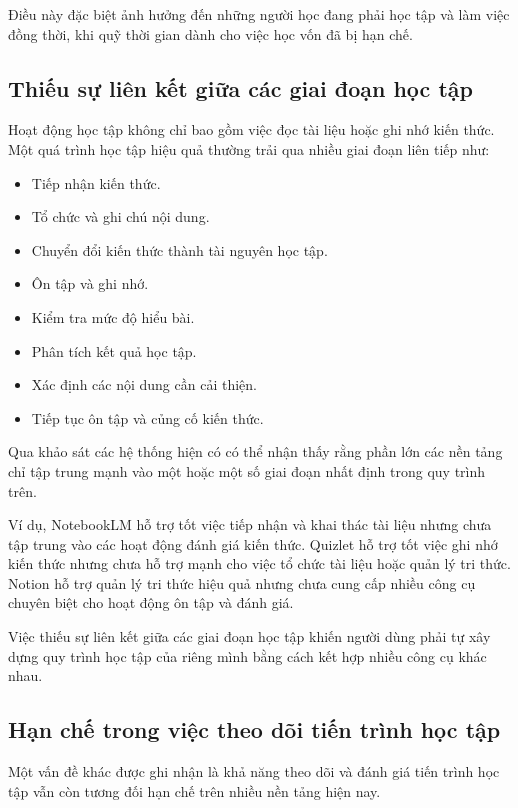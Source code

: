 Điều này đặc biệt ảnh hưởng đến những người học đang phải học tập và làm việc đồng thời, khi quỹ thời gian dành cho việc học vốn đã bị hạn chế.

\subsection{Thiếu sự liên kết giữa các giai đoạn học tập}

Hoạt động học tập không chỉ bao gồm việc đọc tài liệu hoặc ghi nhớ kiến thức. Một quá trình học tập hiệu quả thường trải qua nhiều giai đoạn liên tiếp như:
\begin{itemize}
    \item Tiếp nhận kiến thức.
    \item Tổ chức và ghi chú nội dung.
    \item Chuyển đổi kiến thức thành tài nguyên học tập.
    \item Ôn tập và ghi nhớ.
    \item Kiểm tra mức độ hiểu bài.
    \item Phân tích kết quả học tập.
    \item Xác định các nội dung cần cải thiện.
    \item Tiếp tục ôn tập và củng cố kiến thức.
\end{itemize}

Qua khảo sát các hệ thống hiện có có thể nhận thấy rằng phần lớn các nền tảng chỉ tập trung mạnh vào một hoặc một số giai đoạn nhất định trong quy trình trên.

Ví dụ, NotebookLM hỗ trợ tốt việc tiếp nhận và khai thác tài liệu nhưng chưa tập trung vào các hoạt động đánh giá kiến thức. Quizlet hỗ trợ tốt việc ghi nhớ kiến thức nhưng chưa hỗ trợ mạnh cho việc tổ chức tài liệu hoặc quản lý tri thức. Notion hỗ trợ quản lý tri thức hiệu quả nhưng chưa cung cấp nhiều công cụ chuyên biệt cho hoạt động ôn tập và đánh giá.

Việc thiếu sự liên kết giữa các giai đoạn học tập khiến người dùng phải tự xây dựng quy trình học tập của riêng mình bằng cách kết hợp nhiều công cụ khác nhau.

\subsection{Hạn chế trong việc theo dõi tiến trình học tập}

Một vấn đề khác được ghi nhận là khả năng theo dõi và đánh giá tiến trình học tập vẫn còn tương đối hạn chế trên nhiều nền tảng hiện nay.

